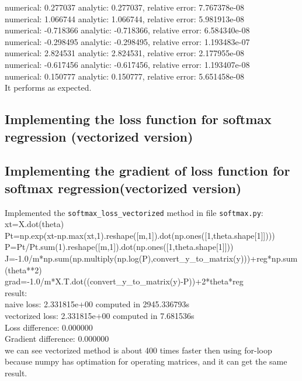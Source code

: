 \documentclass{article}
\begin{document}
numerical: 0.277037 analytic: 0.277037, relative error: 7.767378e-08\\
numerical: 1.066744 analytic: 1.066744, relative error: 5.981913e-08\\
numerical: -0.718366 analytic: -0.718366, relative error: 6.584340e-08\\
numerical: -0.298495 analytic: -0.298495, relative error: 1.193483e-07\\
numerical: 2.824531 analytic: 2.824531, relative error: 2.177955e-08\\
numerical: -0.617456 analytic: -0.617456, relative error: 1.193407e-08\\
numerical: 0.150777 analytic: 0.150777, relative error: 5.651458e-08\\[10pt]
It performs as expected.\\
\subsection{Implementing the loss function for softmax regression (vectorized version)}
\subsection{Implementing the gradient of loss function for softmax regression(vectorized version)}
Implemented the \verb|softmax_loss_vectorized| method in file \verb|softmax.py|:\\[10pt]
xt=X.dot(theta)\\
Pt=np.exp(xt-np.max(xt,1).reshape([m,1]).dot(np.ones([1,theta.shape[1]])))\\
P=Pt/Pt.sum(1).reshape([m,1]).dot(np.ones([1,theta.shape[1]]))\\
J=-1.0/m*np.sum(np.multiply(np.log(P),convert\_y\_to\_matrix(y)))+reg*np.sum(theta**2)\\ grad=-1.0/m*X.T.dot((convert\_y\_to\_matrix(y)-P))+2*theta*reg\\[10pt]
result:\\[10pt]
naive loss: 2.331815e+00 computed in 2945.336793s\\
vectorized loss: 2.331815e+00 computed in 7.681536s\\
Loss difference: 0.000000\\
Gradient difference: 0.000000\\[10pt]
we can see vectorized method is about 400 times faster then using for-loop because numpy has optimation for operating matrices, and it can get the same result.\\
\end{document}
